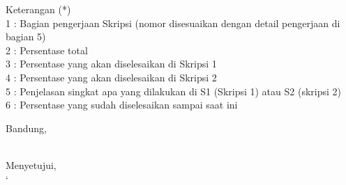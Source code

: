 \documentclass[a4paper,twoside]{article}
\begin{document}
Keterangan (*)\\
1 : Bagian pengerjaan Skripsi (nomor disesuaikan dengan detail pengerjaan di bagian 5)\\
2 : Persentase total \\
3 : Persentase yang akan diselesaikan di Skripsi 1 \\
4 : Persentase yang akan diselesaikan di Skripsi 2 \\
5 : Penjelasan singkat apa yang dilakukan di S1 (Skripsi 1) atau S2 (skripsi 2)\\
6 : Persentase yang sudah diselesaikan sampai saat ini 


\vspace{1cm}
\centering Bandung, \tanggal\\
\vspace{2cm} \nama \\ 
\vspace{1cm}

Menyetujui, \\
`
\end{document}
